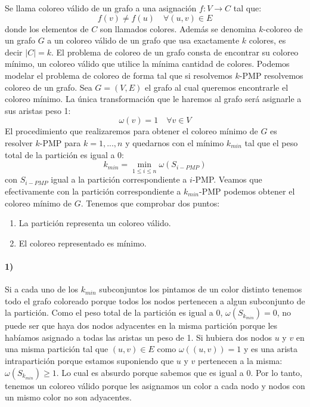 Se llama coloreo válido de un grafo a una asignación $f:V \rightarrow C$ tal que:
\begin{displaymath}
f(v) \neq f(u) \quad \forall (u, v) \in E
\end{displaymath}
donde los elementos de $C$ son llamados colores. Además se denomina $k$-coloreo de un grafo $G$ a un coloreo
válido de un grafo que usa exactamente $k$ colores, es decir $\left\vert{C}\right\vert = k$. El problema de coloreo
de un grafo consta de encontrar su coloreo mínimo, un coloreo válido que utilice la mínima cantidad de colores. Podemos
modelar el problema de coloreo de forma tal que si resolvemos $k$-PMP resolvemos coloreo de un grafo.
Sea $G = (V, E)$ el grafo al cual queremos encontrarle el coloreo mínimo. La única transformación que le haremos al grafo 
será asignarle a sus aristas peso 1:
\begin{displaymath}
\omega(v) = 1 \quad \forall v \in V
\end{displaymath}
El procedimiento que realizaremos para obtener el coloreo mínimo de $G$ es resolver $k$-PMP para $k = 1,...,n$ y quedarnos
con el mínimo $k_{min}$ tal que el peso total de la partición es igual a 0:
\begin{displaymath}
  k_{min} = \min_{1 \leq i \leq n} \omega(S_{i-PMP})
\end{displaymath}
con $S_{i-PMP}$ igual a la partición correspondiente a $i$-PMP. Veamos que efectivamente con la partición correspondiente a $k_{min}$-PMP podemos
obtener el coloreo mínimo de $G$. Tenemos que comprobar dos puntos:
\begin{enumerate}
  \item La partición representa un coloreo válido.
  \item El coloreo representado es mínimo.
\end{enumerate}

\paragraph{1)}
Si a cada uno de los $k_{min}$ subconjuntos los pintamos de un color distinto tenemos todo el grafo coloreado
porque todos los nodos pertenecen a algun subconjunto de la partición. Como el peso total de la partición
es igual a 0, $\omega(S_{k_{min}}) = 0$, no puede ser que haya dos nodos adyacentes en la misma partición
porque les habíamos asignado a todas las aristas un peso de 1. Si hubiera dos nodos $u$ y $v$ en una misma
partición tal que $(u, v) \in E$ como $\omega((u,v)) =  1$ y es una arista intrapartición porque estamos
suponiendo que $u$ y $v$ pertenecen a la misma: $\omega(S_{k_{min}}) \geq 1$. Lo cual es absurdo porque 
sabemos que es igual a 0. Por lo tanto, tenemos un coloreo válido porque les asignamos un color a cada nodo 
y nodos con un mismo color no son adyacentes.

